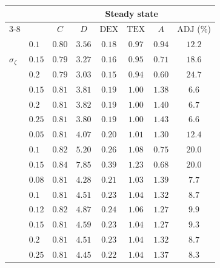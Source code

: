 \begin{tabular}{llcccccc}
\hline
 &  & \multicolumn{6}{c}{Steady state} \\
\cline{3-8}
 &  & $C$ & $D$ & $\mathrm{DEX}$ & $\mathrm{TEX}$ & $A$ & $\mathrm{ADJ}$ (\%) \\
\hline
\multirow{3}{*}{$\sigma_\zeta$} & $0.1$ & $0.80$ & $3.56$ & $0.18$ & $0.97$ & $0.94$ & $12.2$ \\
 & $0.15$ & $0.79$ & $3.27$ & $0.16$ & $0.95$ & $0.71$ & $18.6$ \\
 & $0.2$ & $0.79$ & $3.03$ & $0.15$ & $0.94$ & $0.60$ & $24.7$ \\
\addlinespace
\multirow{3}{*}{$S$} & $0.15$ & $0.81$ & $3.81$ & $0.19$ & $1.00$ & $1.38$ & $6.6$ \\
 & $0.2$ & $0.81$ & $3.82$ & $0.19$ & $1.00$ & $1.40$ & $6.7$ \\
 & $0.25$ & $0.81$ & $3.80$ & $0.19$ & $1.00$ & $1.43$ & $6.6$ \\
\addlinespace
\multirow{3}{*}{$\sigma_p$} & $0.05$ & $0.81$ & $4.07$ & $0.20$ & $1.01$ & $1.30$ & $12.4$ \\
 & $0.1$ & $0.82$ & $5.20$ & $0.26$ & $1.08$ & $0.75$ & $20.0$ \\
 & $0.15$ & $0.84$ & $7.85$ & $0.39$ & $1.23$ & $0.68$ & $20.0$ \\
\addlinespace
\multirow{3}{*}{$\sigma_p$ ($S=0.2$)} & $0.08$ & $0.81$ & $4.28$ & $0.21$ & $1.03$ & $1.39$ & $7.7$ \\
 & $0.1$ & $0.81$ & $4.51$ & $0.23$ & $1.04$ & $1.32$ & $8.7$ \\
 & $0.12$ & $0.82$ & $4.87$ & $0.24$ & $1.06$ & $1.27$ & $9.9$ \\
\addlinespace
\multirow{3}{*}{$S$ ($\sigma_p=0.1$)} & $0.15$ & $0.81$ & $4.59$ & $0.23$ & $1.04$ & $1.27$ & $9.3$ \\
 & $0.2$ & $0.81$ & $4.51$ & $0.23$ & $1.04$ & $1.32$ & $8.7$ \\
 & $0.25$ & $0.81$ & $4.45$ & $0.22$ & $1.04$ & $1.37$ & $8.3$ \\
\hline
\end{tabular}
